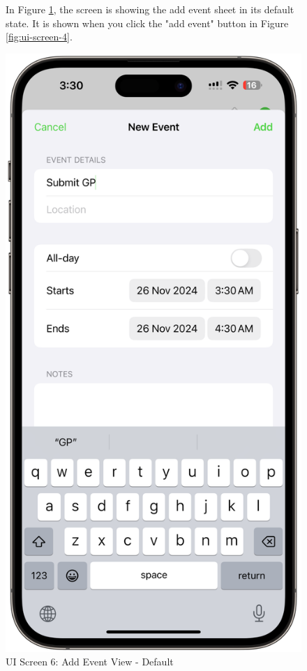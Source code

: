 \begin{figure}[!h]
    \begin{minipage}{0.65\textwidth}
        In Figure \ref{fig:ui-screen-6}, the screen is showing the add event sheet in its default state. It is shown when you click the "add event" button in Figure \ref{fig:ui-screen-4}.
    \end{minipage}
    \hfill
    \begin{minipage}{0.3\textwidth}
        \centering
        \includegraphics[width=\textwidth]{images/screen6.png}
        \caption{UI Screen 6: Add Event View - Default}
        \label{fig:ui-screen-6}
    \end{minipage}
\end{figure}

